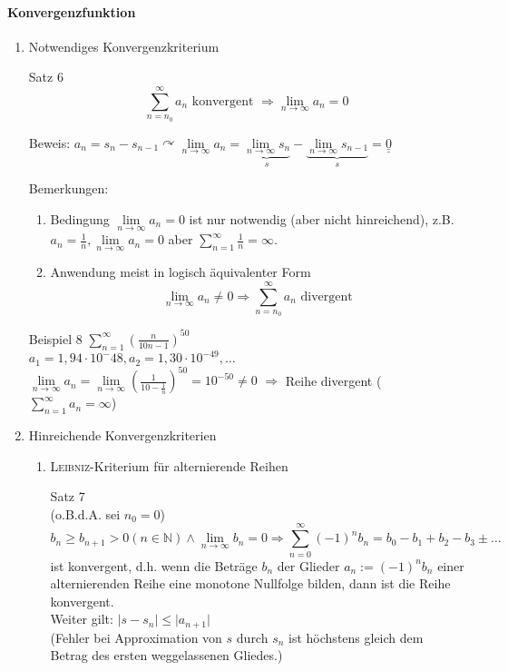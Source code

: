 \documentclass[a4paper]{scrartcl}
\begin{document}
\paragraph{Konvergenzfunktion}
\begin{enumerate}
\item Notwendiges Konvergenzkriterium

Satz 6
\[\sum\limits_{n=n_0}^{\infty} a_n \text{ konvergent } \Rightarrow \lim\limits_{n \to \infty} a_n = 0\]

Beweis: $a_n = s_n - s_{n-1} \curvearrowright \lim\limits_{n \to \infty} a_n = \underbrace{\lim\limits_{n \to \infty} s_n}_{s} - \underbrace{\lim\limits_{n \to \infty} s_{n-1}}_{s} = \underline{\underline{0}}$

Bemerkungen:
\begin{enumerate}
\item Bedingung $\lim\limits_{n \to \infty} a_n = 0 $ ist nur notwendig (aber nicht hinreichend), z.B. $a_n = \frac{1}{n}, \lim\limits_{n \to \infty} a_n = 0$ aber $\sum\limits_{n=1}^{\infty} \frac{1}{n} = \infty$.
\item Anwendung meist in logisch äquivalenter Form
\[ \lim\limits_{n \to \infty} a_n \neq 0 \Rightarrow \sum\limits_{n = n_0}^{\infty} a_n \text{ divergent}\]
\end{enumerate}

Beispiel 8 
$\sum\limits_{n=1}^{\infty} (\frac{n}{10n-1})^{50}$\\
$a_1 = 1,94 \cdot 10^-48 , a_2 = 1,30 \cdot 10^{-49}, \dots$\\
$\lim\limits_{n \to \infty} a_n = \lim\limits_{n \to \infty} (\frac{1}{10 - \frac{1}{n}})^{50} = 10^{-50} \neq 0$
$\Rightarrow$ Reihe divergent ( $\sum\limits_{n=1}^{\infty} a_n = \infty $)
\item Hinreichende Konvergenzkriterien

\begin{enumerate}
\item \textsc{Leibniz}-Kriterium für alternierende Reihen

Satz 7\\
(o.B.d.A. sei $n_0 = 0$)
\[ b_n \geq b_{n+1} > 0 (n \in \mathbb{N}) \wedge \lim\limits_{n \to \infty} b_n = 0 \Rightarrow \sum\limits_{n=0}^{\infty} (-1)^n b_n = b_0 - b_1 + b_2 - b_3 \pm \dots\]
ist konvergent, d.h. wenn die Beträge $b_n$ der Glieder $a_n:= (-1)^n b_n$ einer alternierenden Reihe eine monotone Nullfolge bilden, dann ist die Reihe konvergent.\\
Weiter gilt: $\lvert s -s_n \rvert \leq \lvert a_{n+1} \rvert$\\
(Fehler bei Approximation von $s$ durch $s_n$ ist höchstens gleich dem Betrag des ersten weggelassenen Gliedes.)


\end{enumerate}
\end{enumerate}
\end{document}
